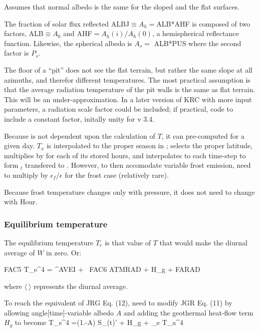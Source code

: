 Assumes that normal albedo is the same for the sloped and the flat surfaces.

The fraction of solar flux reflected ALBJ$\equiv A_h =$ALB*AHF is composed of
two factors, ALB$\equiv A_0$ and AHF$=A_h(i)/A_h(0)$, a hemispherical
reflectance function.  Likewise, the spherical albedo is $A_s=$ ALB*PUS where
the second factor is $P_s$.

The floor of a ``pit'' does not see the flat terrain, but rather the same slope
at all azimuths, and therefor different temperatures. The most practical
assumption is that the average radiation temperature of the pit walls is the
same as flat terrain. This will be an under-approximation. In a later version of
KRC with more input parameters, a radiation scale factor could be included; if
practical, code to include a constant factor, initally unity for v 3.4.

Because  is not dependent upon the calculation of $T$, it can
pre-computed for a given day. $T_x$ is interpolated to the proper season in
;  selects the proper latitude, multiplies by  for
each of its stored hours, and interpolates to each time-step to form
$_t$ transfered to . However, to then accomodate variable
frost emission, need to multiply by $\epsilon_f/\epsilon$ for the frost case
(relatively rare).

\vspace{0.2cm}
Because frost temperature changes only with pressure, it does not need to change with Hour.
\pagebreak
\subsubsection{Equilibrium temperature  \label{eqT} }
The equilibrium temperature $T_e$ is that value of $T$ that would make the diurnal average of $W$  in  zero. Or: 

\qbn FAC5 \ast T_e^4 = \langle {}^{\Delta AVEI} \rangle  + \ FAC6 \ast \langle ATMRAD \rangle  + H_g  + \langle FARAD \rangle {}

where $ \langle \  \rangle $ represents the diurnal average.

To reach the equivalent of JRG Eq. (12), need to modify JGR Eq. (11) by allowing angle[time]-variable albedo $A$ and adding the geothermal heat-flow term $H_g$ to become 
\qbn \epsilon \sigma  \langle T_s^4 \rangle =\langle (1.-A) S_{(t)}' \rangle  
+ H_g + \epsilon \sigma  \beta_e \langle T_a^4 \rangle {} 

